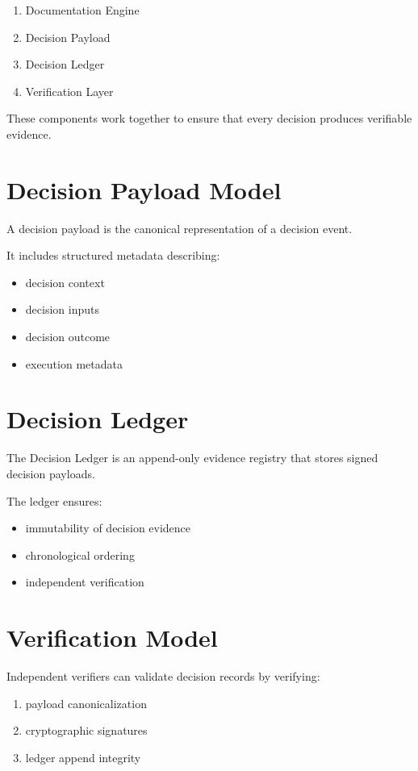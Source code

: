 \documentclass[11pt]{article}
\begin{document}
\begin{enumerate}
\item Documentation Engine
\item Decision Payload
\item Decision Ledger
\item Verification Layer
\end{enumerate}

These components work together to ensure that every decision produces
verifiable evidence.

\section{Decision Payload Model}

A decision payload is the canonical representation of a decision
event.

It includes structured metadata describing:

\begin{itemize}
\item decision context
\item decision inputs
\item decision outcome
\item execution metadata
\end{itemize}

\section{Decision Ledger}

The Decision Ledger is an append-only evidence registry that stores
signed decision payloads.

The ledger ensures:

\begin{itemize}
\item immutability of decision evidence
\item chronological ordering
\item independent verification
\end{itemize}

\section{Verification Model}

Independent verifiers can validate decision records by verifying:

\begin{enumerate}
\item payload canonicalization
\item cryptographic signatures
\item ledger append integrity
\end{enumerate}
\end{document}

